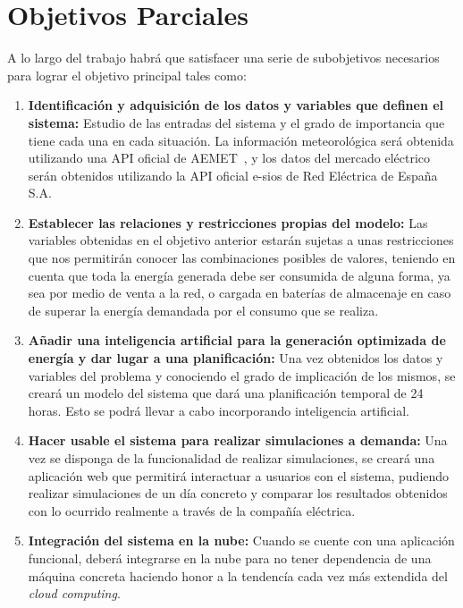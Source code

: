 \section{Objetivos Parciales}
A lo largo del trabajo habrá que satisfacer una serie de subobjetivos necesarios para lograr el objetivo principal tales como:
\begin{enumerate}
	\item \textbf{Identificación y adquisición de los datos y variables que definen el sistema:}
	Estudio de las entradas del sistema y el grado de importancia que tiene cada una en cada situación. La información meteorológica será obtenida utilizando una API oficial de AEMET~\cite{Aemet}, y los datos del mercado eléctrico serán obtenidos utilizando la API oficial e-sios de Red Eléctrica de España S.A.~\cite{Ree}

	\item \textbf{Establecer las relaciones y restricciones propias del modelo:}
	Las variables obtenidas en el objetivo anterior estarán sujetas a unas restricciones que nos permitirán conocer las combinaciones posibles de valores, teniendo en cuenta que toda la energía generada debe ser consumida de alguna forma, ya sea por medio de venta a la red, o cargada en baterías de almacenaje en caso de superar la energía demandada por el consumo que se realiza.

	\item \textbf{Añadir una inteligencia artificial para la generación optimizada de energía y dar lugar a una planificación:}
	Una vez obtenidos los datos y variables del problema y conociendo el grado de implicación de los mismos, se creará un modelo del sistema que dará una planificación temporal de 24 horas. Esto se podrá llevar a cabo incorporando inteligencia artificial.

      \item \textbf{Hacer usable el sistema para realizar simulaciones a demanda:}
        Una vez se disponga de la funcionalidad de realizar simulaciones, se creará una aplicación web que permitirá interactuar a usuarios con el sistema, pudiendo realizar simulaciones de un día concreto y comparar los resultados obtenidos con lo ocurrido realmente a través de la compañía eléctrica.

      \item \textbf{Integración del sistema en la nube:}
        Cuando se cuente con una aplicación funcional, deberá integrarse en la nube para no tener dependencia de una máquina concreta haciendo honor a la tendencía cada vez más extendida del \textit{cloud computing}.

\end{enumerate}
